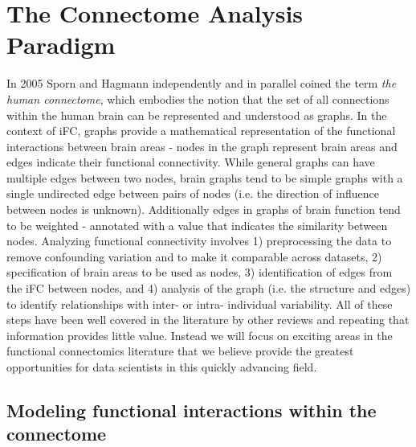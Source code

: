 \documentclass{bmcart}
\begin{document}
\section{The Connectome Analysis Paradigm}

In 2005 Sporn and Hagmann \cite{Sporns2005,Hagmann2005} independently and in parallel coined the term \textit{the human connectome}, which embodies the notion that the set of all connections within the human brain can be represented and understood as graphs. In the context of iFC, graphs provide a mathematical representation of the functional interactions between brain areas -  nodes in the graph represent brain areas and edges indicate their functional connectivity. While general graphs can have multiple edges between two nodes, brain graphs tend to be simple graphs with a single undirected edge between pairs of nodes (i.e. the direction of influence between nodes is unknown). Additionally edges in graphs of brain function tend to be weighted - annotated with a value that indicates the similarity between nodes. Analyzing functional connectivity involves 1) preprocessing the data to remove confounding variation and to make it comparable across datasets, 2) specification of brain areas to be used as nodes, 3) identification of edges from the iFC between nodes, and 4) analysis of the graph (i.e. the structure and edges) to identify relationships with inter- or intra- individual variability. All of these steps have been well covered in the literature by other reviews \cite{Craddock2013,Kelly2012,Varoquaux2013} and repeating that information provides little value. Instead we will focus on exciting areas in the functional connectomics literature that we believe provide the greatest opportunities for data scientists in this quickly advancing field.

\subsection{Modeling functional interactions within the connectome}
\end{document}
